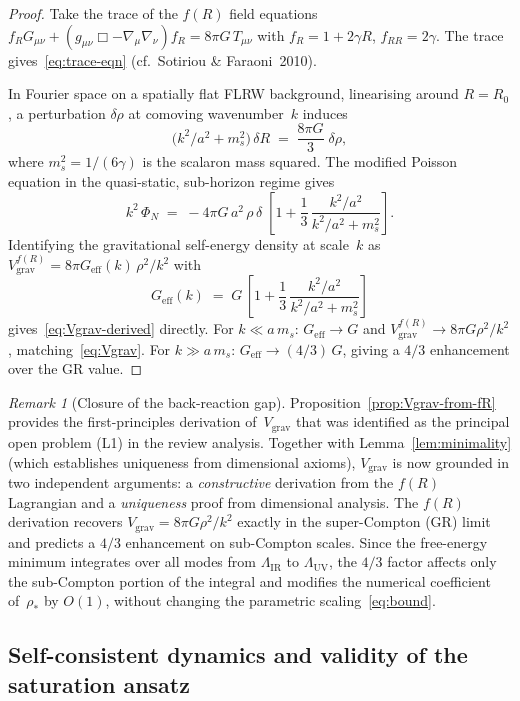 \documentclass[12pt,a4paper]{article}
\theoremstyle{definition}
\theoremstyle{plain}
\theoremstyle{remark}
\newtheorem{remark}[definition]{Remark}
\newcommand{\LUV}{\Lambda_{\mathrm{UV}}}
\newcommand{\LIR}{\Lambda_{\mathrm{IR}}}
\begin{document}
\begin{proof}
Take the trace of the $f(R)$ field equations
$f_R G_{\mu\nu} + (g_{\mu\nu}\Box - \nabla_\mu\nabla_\nu)f_R
= 8\pi G\,T_{\mu\nu}$ with $f_R = 1 + 2\gamma R$, $f_{RR} = 2\gamma$.
The trace gives~\eqref{eq:trace-eqn} (cf.~Sotiriou \&
Faraoni~2010).

In Fourier space on a spatially flat FLRW background, linearising around
$R = R_0$, a perturbation $\delta\rho$ at comoving wavenumber~$k$ induces
\[
  \bigl(k^2/a^2 + m_s^2\bigr)\,\delta R
  \;=\; \frac{8\pi G}{3}\;\delta\rho,
\]
where $m_s^2 = 1/(6\gamma)$ is the scalaron mass squared. The
modified Poisson equation in the quasi-static, sub-horizon regime
gives~\cite{HuSawicki2007}
\[
  k^2\,\Phi_N \;=\; -4\pi G\,a^2\,\rho\,\delta
  \;\left[1 + \frac{1}{3}\,\frac{k^2/a^2}{k^2/a^2 + m_s^2}\right].
\]
Identifying the gravitational self-energy density at scale~$k$ as
$V_{\mathrm{grav}}^{f(R)} = 8\pi G_{\mathrm{eff}}(k)\,\rho^2/k^2$
with
\[
  G_{\mathrm{eff}}(k) \;=\; G\,\left[1 + \frac{1}{3}\,
  \frac{k^2/a^2}{k^2/a^2 + m_s^2}\right]
\]
gives~\eqref{eq:Vgrav-derived} directly.
For $k \ll a\,m_s$: $G_{\mathrm{eff}} \to G$ and
$V_{\mathrm{grav}}^{f(R)} \to 8\pi G\rho^2/k^2$,
matching~\eqref{eq:Vgrav}.
For $k \gg a\,m_s$: $G_{\mathrm{eff}} \to (4/3)\,G$, giving a
$4/3$ enhancement over the GR value.
\end{proof}

\begin{remark}[Closure of the back-reaction gap]
Proposition~\ref{prop:Vgrav-from-fR} provides the first-principles
derivation of~$V_{\mathrm{grav}}$ that was identified as the principal
open problem (L1) in the review analysis. Together with
Lemma~\ref{lem:minimality} (which establishes uniqueness from dimensional
axioms), $V_{\mathrm{grav}}$ is now grounded in two independent
arguments: a \emph{constructive} derivation from the $f(R)$ Lagrangian
and a \emph{uniqueness} proof from dimensional analysis.  The $f(R)$
derivation recovers $V_{\mathrm{grav}} = 8\pi G\rho^2/k^2$ exactly in
the super-Compton (GR) limit and predicts a $4/3$ enhancement on
sub-Compton scales.  Since the free-energy minimum integrates over all
modes from $\LIR$ to $\LUV$, the $4/3$ factor affects only the
sub-Compton portion of the integral and modifies the numerical
coefficient of~$\rho_\ast$ by $O(1)$, without changing the parametric
scaling~\eqref{eq:bound}.
\end{remark}

\subsection{Self-consistent dynamics and validity of the saturation ansatz}
\label{sec:self-consistent}
\end{document}
